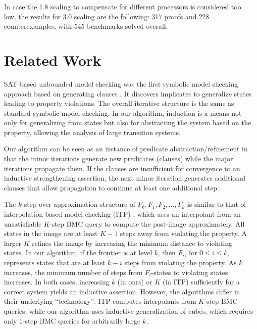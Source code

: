 \documentclass{llncs}
\begin{document}
In case the 1.8 scaling to compensate for different processors is
considered too low, the results for 3.0 scaling are the following: 317
proofs and 228 counterexamples, with 545 benchmarks solved overall.

\section{Related Work}
\label{sec:related}



SAT-based unbounded model checking was the first symbolic model
checking approach based on generating clauses \cite{McMillan/2002}.
It discovers implicates to generalize states leading to property
violations.  The overall iterative structure is the same as standard
symbolic model checking.  In our algorithm, induction is a means not
only for generalizing from states but also for abstracting the system
based on the property, allowing the analysis of large transition
systems.



Our algorithm can be seen as an instance of predicate
abstraction/refinement \cite{Graf+Saidi/1997,Clarke+Others/2003} in
that the minor iterations generate new predicates (clauses) while the
major iterations propagate them.  If the clauses are insufficient for
convergence to an inductive strengthening assertion, the next minor
iteration generates additional clauses that allow propagation to
continue at least one additional step.



The $k$-step over-approximation structure of $F_{0}, F_{1}, F_{2},
\ldots, F_{k}$ is similar to that of interpolation-based model checking
(ITP) \cite{McMillan/2003}, which uses an interpolant from an
unsatisfiable $K$-step BMC query to compute the post-image
approximately.  All states in the image are at least $K-1$ steps away
from violating the property.  A larger $K$ refines the image by
increasing the minimum distance to violating states.  In our
algorithm, if the frontier is at level $k$, then $F_{i}$, for $0 \le i
\le k$, represents states that are at least $k-i$ steps from violating
the property.  As $k$ increases, the minimum number of steps from
$F_{i}$-states to violating states increases.  In both cases,
increasing $k$ (in ours) or $K$ (in ITP) sufficiently for a correct
system yields an inductive assertion.  However, the algorithms differ
in their underlying ``technology'': ITP computes interpolants from
$K$-step BMC queries, while our algorithm uses inductive
generalization of cubes, which requires only 1-step BMC queries for
arbitrarily large $k$.
\end{document}
